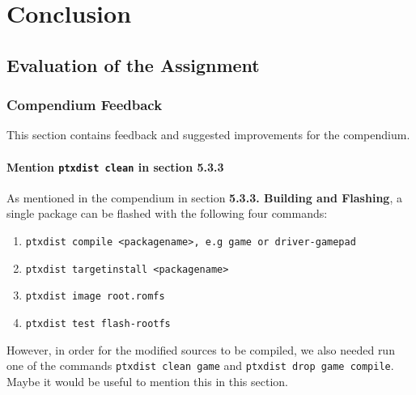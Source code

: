 \chapter{Conclusion}

\section{Evaluation of the Assignment}

\subsection{Compendium Feedback}
This section contains feedback and suggested improvements for the compendium.

\subsubsection{Mention \texttt{ptxdist clean} in section 5.3.3}
As mentioned in the compendium in section \textbf{5.3.3. Building and Flashing}, a single package can be flashed with the following four commands:
\begin{enumerate}
  \item \texttt{ptxdist compile <packagename>, e.g game or driver-gamepad}
  \item \texttt{ptxdist targetinstall <packagename>}
  \item \texttt{ptxdist image root.romfs}
  \item \texttt{ptxdist test flash-rootfs}
\end{enumerate}
However, in order for the modified sources to be compiled, we also needed run one of the commands \texttt{ptxdist clean game} and \texttt{ptxdist drop game compile}. Maybe it would be useful to mention this in this section.

